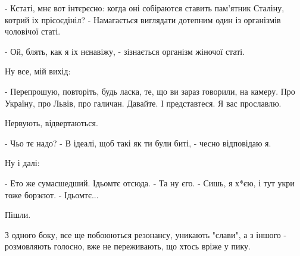 - Кстаті, мнє вот інтєрєсно: когда оні собіраются ставить пам'ятник Сталіну,
котрий іх прісоєдініл? - Намагається виглядати дотепним один із організмів
чоловічої статі.

- Ой, блять, как я іх нєнавіжу, - зізнається організм жіночої статі.

Ну все, мій вихід:

- Перепрошую, повторіть, будь ласка, те, що ви зараз говорили, на камеру. Про
Україну, про Львів, про галичан. Давайте. І представтеся. Я вас прославлю.

Нервують, відвертаються.

- Чьо тє надо?
- В ідеалі, щоб такі як ти були биті, - чесно відповідаю я.

Ну і далі:

- Ето же сумасшедший. Ідьомтє отсюда.
- Та ну єго.
- Сишь, я х*єю, і тут укри тоже борзєют.
- Ідьомтє...

Пішли.

З одного боку, все ще побоюються резонансу, уникають "слави", а з іншого -
розмовляють голосно, вже не переживають, що хтось вріже у пику.



